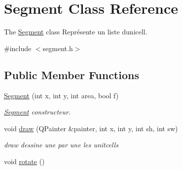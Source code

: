 \hypertarget{class_segment}{}\section{Segment Class Reference}
\label{class_segment}


The \hyperlink{class_segment}{Segment} class Représente un liste d\textquotesingle{}unicell.  




{\ttfamily \#include $<$segment.\+h$>$}

\subsection*{Public Member Functions}
\begin{DoxyCompactItemize}
\item 
\hyperlink{class_segment_a8251e7e03f8fb4a65a35f1c7a1c6e806}{Segment} (int x, int y, int area, bool f)
\begin{DoxyCompactList}\small\item\em \hyperlink{class_segment}{Segment} constructeur. \end{DoxyCompactList}\item 
void \hyperlink{class_segment_ad3d691fcf0dd3e1c6478274589cfb425}{draw} (Q\+Painter \&painter, int x, int y, int sh, int sw)
\begin{DoxyCompactList}\small\item\em draw dessine une par une les unitcells \end{DoxyCompactList}\item 
void \hyperlink{class_segment_afac9424a18e0e264208d754cc3a1439a}{rotate} ()\hypertarget{class_segment_afac9424a18e0e264208d754cc3a1439a}{}\label{class_segment_afac9424a18e0e264208d754cc3a1439a}


\end{DoxyCompactItemize}

